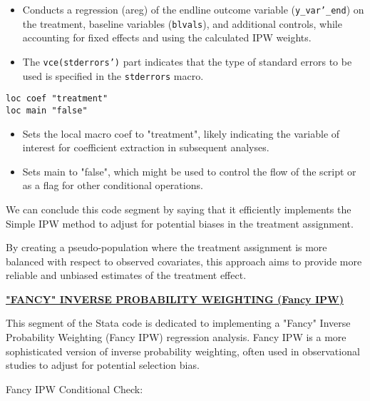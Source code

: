 \documentclass{article}
\begin{document}
\begin{itemize}
    \item Conducts a regression (areg) of the endline outcome variable (\texttt{y\_var'\_end}) on the treatment, baseline variables (\texttt{blvals}), and additional controls, while accounting for fixed effects and using the calculated IPW weights.
    \item The \texttt{vce(stderrors')} part indicates that the type of standard errors to be used is specified in the \texttt{stderrors} macro.
\end{itemize}

\begin{mdframed}
\begin{verbatim}
loc coef "treatment"
loc main "false"
\end{verbatim}
\end{mdframed}

\begin{itemize}
    \item Sets the local macro coef to "treatment", likely indicating the variable of interest for coefficient extraction in subsequent analyses.
    \item Sets main to "false", which might be used to control the flow of the script or as a flag for other conditional operations.
\end{itemize}
\vspace{0.3cm}
We can conclude this code segment by saying that it efficiently implements the Simple IPW method to adjust for potential biases in the treatment assignment. \newline

By creating a pseudo-population where the treatment assignment is more balanced with respect to observed covariates, this approach aims to provide more reliable and unbiased estimates of the treatment effect.\newline


    

\underline{\textbf{"FANCY" INVERSE PROBABILITY WEIGHTING (Fancy IPW)}}

\vspace{0.3cm}This segment of the Stata code is dedicated to implementing a "Fancy" Inverse Probability Weighting (Fancy IPW) regression analysis. Fancy IPW is a more sophisticated version of inverse probability weighting, often used in observational studies to adjust for potential selection bias. \newline

Fancy IPW Conditional Check:
\end{document}
